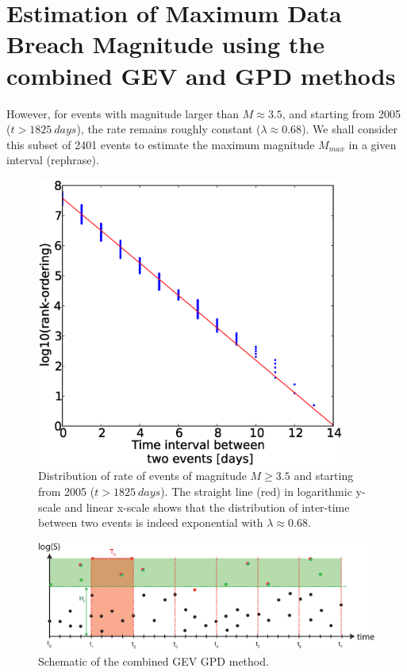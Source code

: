 \section{Estimation of Maximum Data Breach Magnitude using the combined GEV and GPD methods}




However, for events with magnitude larger than $M \approx 3.5$, and starting from 2005 ($t > 1825~days$), the rate remains roughly constant ($\lambda \approx 0.68$). We shall consider this subset of 2401 events to estimate the maximum magnitude $M_{max}$ in a given interval (rephrase).


\begin{figure}[h]
\begin{center}
\includegraphics[width=4in]{../figures/SI/exponential_distribution.eps}
\caption{Distribution of rate of events of magnitude $M \geqslant 3.5$ and starting from 2005 ($t > 1825~days$). The straight line (red) in logarithmic y-scale and linear x-scale shows that the distribution of inter-time between two events is indeed exponential with $\lambda \approx 0.68$.}
\label{fig:exponential_rate}
\end{center}
\end{figure}




\begin{figure}[h]
\begin{center}
\includegraphics[width=6in]{../figures/SI/GEV_GPD_combined.eps}
\caption{Schematic of the combined GEV GPD method.}
\label{ }
\end{center}
\end{figure}






